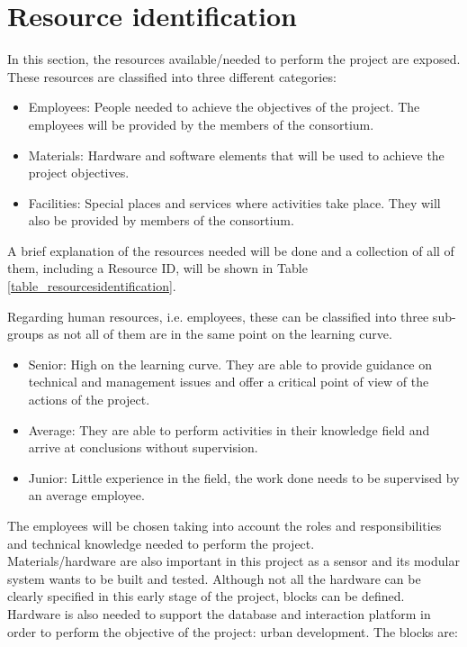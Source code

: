 \section{Resource identification}
\label{sec4.1}

In this section, the resources available/needed to perform the project are exposed. These resources are classified into three different categories: 

\begin{itemize}
\item Employees: People needed to achieve the objectives of the project. The employees will be provided by the members of the consortium. 
\item Materials: Hardware and software elements that will be used to achieve the project objectives.
\item Facilities: Special places and services where activities take place. They will also be provided by members of the consortium.
\end{itemize}

A brief explanation of the resources needed will be done and a collection of all of them, including a Resource ID, will be shown in Table \ref{table_resourcesidentification}.

Regarding human resources, i.e. employees, these can be classified into three sub-groups as not all of them are in the same point on the learning curve.

\begin{itemize}
\item Senior: High on the learning curve. They are able to provide guidance on technical and management issues and offer a critical point of view of the actions of the project.
\item Average: They are able to perform activities in their knowledge field and arrive at conclusions without supervision.
\item Junior: Little experience in the field, the work done needs to be supervised by an average employee.
\end{itemize}

The employees will be chosen taking into account the roles and responsibilities and technical knowledge needed to perform the project.\\
Materials/hardware are also important in this project as a sensor and its modular system wants to be built and tested. Although not all the hardware can be clearly specified in this early stage of the project, blocks can be defined. Hardware is also needed to support the database and interaction platform in order to perform the objective of the project: urban development. The blocks are: 

